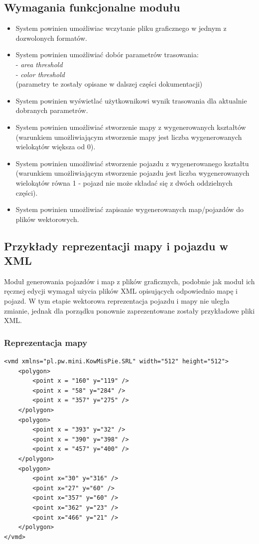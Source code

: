 \documentclass{article}
\begin{document}
\subsection{Wymagania funkcjonalne modułu}
\begin{itemize}
	\item System powinien umożliwiac wczytanie pliku graficznego w jednym z dozwolonych formatów.
	\item System powinien umożliwiać dobór parametrów trasowania:
		\\- \textit{area threshold}
		\\- \textit{color threshold}
		\\(parametry te zostały opisane w dalszej części dokumentacji)
	\item System powinien wyświetlać użytkownikowi wynik trasowania dla aktualnie dobranych parametrów.
	\item System powinien umożliwiać stworzenie mapy z wygenerowanych kształtów (warunkiem umożliwiającym stworzenie mapy jest liczba wygenerowanych wielokątów większa od 0).
	\item System powinien umożliwiać stworzenie pojazdu z wygenerowanego kształtu (warunkiem umożliwiającym stworzenie pojazdu jest liczba wygenerowanych wielokątów równa 1 - pojazd nie może składać się z dwóch oddzielnych części).
	\item System powinien umożliwiać zapisanie wygenerowanych map/pojazdów do plików wektorowych.

\end{itemize}
\newpage
\subsection{Przykłady reprezentacji mapy i pojazdu w XML}

Moduł generowania pojazdów i map z plików graficznych, podobnie jak moduł ich ręcznej edycji wymagał użycia plików XML opisujących odpowiednio mapę i pojazd. W tym etapie wektorowa reprezentacja pojazdu i mapy nie uległa zmianie, jednak dla porządku ponownie zaprezentowane zostały przykładowe pliki XML.

\subsubsection{Reprezentacja mapy}
\begin{lstlisting}
<vmd xmlns="pl.pw.mini.KowMisPie.SRL" width="512" height="512">
	<polygon>
		<point x = "160" y="119" />
		<point x = "58" y="284" />
		<point x = "357" y="275" />
	</polygon>
	<polygon>
		<point x = "393" y="32" />
		<point x = "390" y="398" />
		<point x = "457" y="400" />
	</polygon>
	<polygon>
		<point x="30" y="316" />
		<point x="27" y="60" />
		<point x="357" y="60" />
		<point x="362" y="23" />
		<point x="466" y="21" />
	</polygon>
</vmd>
\end{lstlisting}
\end{document}
